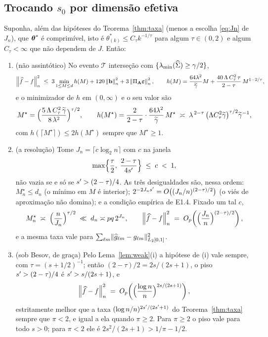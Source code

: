 \documentclass[11pt,a4paper]{article}
\newcommand{\lmin}{\lambda_{\min}}
\newcommand{\Amat}{\mathbf{A}}
\newcommand{\PA}{\Pi_{\Amat}}
\newcommand{\bveps}{\boldsymbol{\varepsilon}}
\newcommand{\bb}{\mathbf{b}}
\newcommand{\gtil}{\widetilde{\gamma}}
\newcommand{\Mstar}{M^{\star}}
\begin{document}
\subsection*{Trocando $s_{0}$ por dimensão efetiva}

\begin{corollary}\label{cor:compressivel}
Suponha, além das hipóteses do Teorema~\ref{thm:taxa} (menos a escolha
\eqref{eq:Jn} de $J_{n}$), que $\boldsymbol{\theta}^{*}$ é comprimível, isto é
$\theta^{*}_{(k)} \le C_{\tau}k^{-1/\tau}$ para algum $\tau \in (0,2)$ e algum
$C_{\tau} < \infty$ que não dependem de $J$. Então:
\begin{enumerate}[label=\textup{(\roman*)}, leftmargin=*]
  \item \textup{(não assintótico)} No evento $\mathcal{T}$ interseção com
    $\{\lmin(\Gramhat)\ge\gamma/2\}$,
    \[
      \normn{\widehat f - f}^{2}
      \;\le\; 3\min_{1\le M\le d}h(M) + 120\normn{\bb}^{2} + 3\normn{\PA\bveps}^{2},
      \qquad
      h(M) = \frac{64\pen^{2}}{\gtil}M
      + \frac{40\,\Lambda\,C_{\tau}^{2}\,\tau}{2-\tau}\,M^{1-2/\tau},
    \]
    e o minimizador de $h$ em $(0,\infty)$ e o seu valor são
    \[
      \Mstar = \Bigl(\frac{5\,\Lambda\,C_{\tau}^{2}\,\gtil}{8\,\pen^{2}}\Bigr)^{\tau/2},
      \qquad
      h(\Mstar) = \frac{2}{2-\tau}\cdot\frac{64\pen^{2}}{\gtil}\,\Mstar
      \;\asymp\; \pen^{\,2-\tau}\,\bigl(\Lambda C_{\tau}^{2}\gtil\bigr)^{\tau/2}
      \gtil^{-1},
    \]
    com $h(\lceil\Mstar\rceil) \le 2h(\Mstar)$ sempre que $\Mstar \ge 1$.
  \item \textup{(a resolução)} Tome $J_{n} = \lceil c\log_{2}n\rceil$ com $c$
    na janela
    \begin{equation}
      \label{eq:janela}
      \max\Bigl\{\frac{\tau}{2},\;\frac{2-\tau}{4s'}\Bigr\}
      \;\le\; c \;<\; 1 ,
    \end{equation}
    não vazia se e só se $s' > (2-\tau)/4$. As três desigualdades são,
    nessa ordem: $\Mstar_{n} \le d_{n}$ (o mínimo em $M$ é interior);
    $2^{-2J_{n}s'} = O\bigl((J_{n}/n)^{(2-\tau)/2}\bigr)$ (o viés de
    aproximação não domina); e a condição empírica de E1.4. Fixado um tal $c$,
    \[
      \Mstar_{n} \;\asymp\; \Bigl(\frac{n}{J_{n}}\Bigr)^{\tau/2}
      \;\ll\; d_{n} \asymp pq\,2^{J_{n}},
      \qquad
      \normn{\widehat f - f}^{2}
      \;=\; O_{p}\!\left(\Bigl(\frac{J_{n}}{n}\Bigr)^{(2-\tau)/2}\right),
    \]
    e a mesma taxa vale para $\sum_{\ell m}\lVert\widehat g_{\ell m} -
    g_{\ell m}\rVert_{L_{2}[0,1]}^{2}$.
  \item \textup{(sob Besov, de graça)} Pelo Lema~\ref{lem:weak}(i) a hipótese
    de (i) vale sempre, com $\tau = (s+1/2)^{-1}$; então
    $(2-\tau)/2 = 2s/(2s+1)$, o piso $s' > (2-\tau)/4$ é
    $s' > s/(2s+1)$, e
    \[
      \left\lVert \widehat f - f \right\rVert_{n}^{2}
      \;=\; O_{p}\!\left(\Bigl(\frac{\log n}{n}\Bigr)^{2s/(2s+1)}\right),
    \]
    estritamente melhor que a taxa $(\log n/n)^{2s'/(2s'+1)}$ do
    Teorema~\ref{thm:taxa} sempre que $\pi < 2$, e igual a ela quando
    $\pi \ge 2$. Para $\pi \ge 2$ o piso vale para todo $s > 0$; para
    $\pi < 2$ ele é $2s^{2}/(2s+1) > 1/\pi - 1/2$.
\end{enumerate}
\end{corollary}
\end{document}
